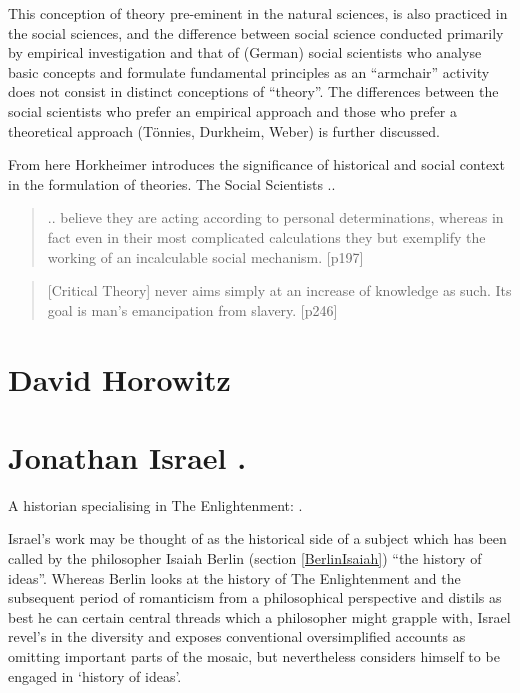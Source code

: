 \documentclass[10pt,titlepage]{book}
\begin{document}
This conception of theory pre-eminent in the natural sciences, is also practiced in the social sciences, and the difference between social science conducted primarily by empirical investigation and that of (German) social scientists who analyse basic concepts and formulate fundamental principles as an ``armchair'' activity does not consist in distinct conceptions of ``theory''.
The differences between the social scientists who prefer an empirical approach and those who prefer a theoretical approach (T\"{o}nnies, Durkheim, Weber) is further discussed.

From here Horkheimer introduces the significance of historical and social context in the formulation of theories.
The Social Scientists ..
\begin{quote}
.. believe they are acting according to personal
determinations, whereas in fact even in their most complicated
calculations they but exemplify the working of an incalculable
social mechanism. [p197]
\end{quote}

\begin{quote}
  [Critical Theory] never aims simply at an increase of knowledge as such. Its goal is man's emancipation from slavery. [p246]
\end{quote}

\section{David Horowitz}\label{HorowitzDavid}

\cite{horowitz-paau,horowitz-bbal}

\section{Jonathan Israel \cite{israel2011revolution,israel2013democratic,israel2006enlightenment,israel2002radical}.}\label{IsraelJonathan}

A historian specialising in The Enlightenment:
\cite{israel2011revolution,israel2013democratic,israel2006enlightenment,israel2002radical}.

Israel's work may be thought of as the historical side of a subject which has been called by the philosopher Isaiah Berlin (section \ref{BerlinIsaiah}) ``the history of ideas''.
Whereas Berlin looks at the history of The Enlightenment and the subsequent period of romanticism from a philosophical perspective and distils as best he can certain central threads which a philosopher might grapple with, Israel revel's in the diversity and exposes conventional oversimplified accounts as omitting important parts of the mosaic, but nevertheless considers himself to be engaged in `history of ideas'.
\end{document}
